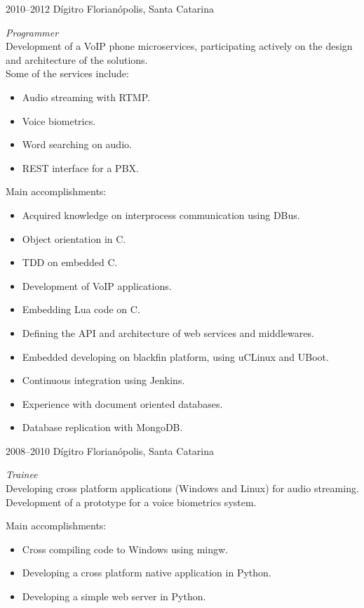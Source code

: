 \documentclass[]{friggeri-cv} %
\begin{document}
\begin{entrylist}
\entry
{2010--2012}
{Dígitro}
{Florianópolis, Santa Catarina}
{\emph{Programmer} \\

Development of a VoIP phone microservices, participating actively on the design and
architecture of the solutions.\\

Some of the services include:\\
\begin{itemize}
\item Audio streaming with RTMP.
\item Voice biometrics.
\item Word searching on audio.
\item REST interface for a PBX.\\
\end{itemize}

Main accomplishments:\\

\begin{itemize}
\item Acquired knowledge on interprocess communication using DBus.
\item Object orientation in C.
\item TDD on embedded C.
\item Development of VoIP applications.
\item Embedding Lua code on C.
\item Defining the API and architecture of web services and middlewares.
\item Embedded developing on blackfin platform, using uCLinux and UBoot.
\item Continuous integration using Jenkins.
\item Experience with document oriented databases.
\item Database replication with MongoDB.\\
\end{itemize}
}
\end{entrylist}
\begin{entrylist}
\entry
{2008--2010}
{Dígitro}
{Florianópolis, Santa Catarina}
{\emph{Trainee} \\

Developing cross platform applications (Windows and Linux) for audio streaming.
Development of a prototype for a voice biometrics system.

Main accomplishments:\\

\begin{itemize}
\item Cross compiling code to Windows using mingw.
\item Developing a cross platform native application in Python.
\item Developing a simple web server in Python.\\
\end{itemize}

}
\end{entrylist}
\end{document}
